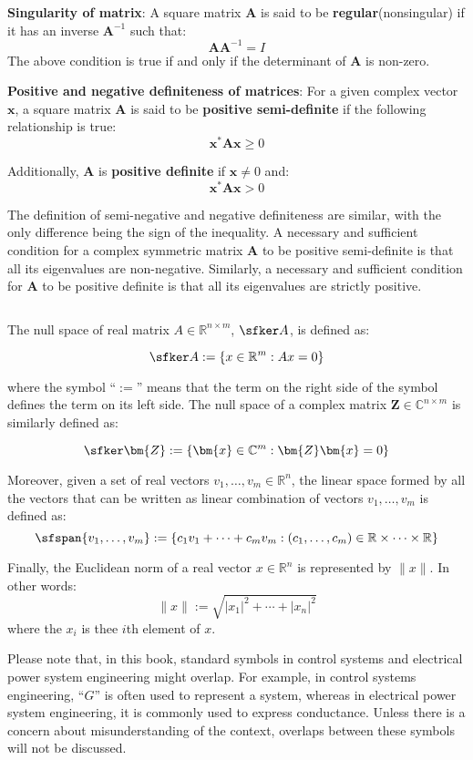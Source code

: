 \documentclass[graybox, envcountchap]{svmult}
\begin{document}
\begin{COLUMN}
\noindent \textbf{Singularity of matrix}:
A square matrix $\bm{A}$ is said to be \textbf{regular}(nonsingular) if it has
an inverse $\bm{A}^{-1}$ such that:
\[
\bm{A}\bm{A}^{-1}=I
\]
The above condition is true if and only if the determinant of $\bm{A}$ is
non-zero.
\smallskip

\noindent \textbf{Positive and negative definiteness of matrices}:
For a given complex vector $\bm{x}$, a square matrix $\bm{A}$ is said to be
\textbf{positive semi-definite} if the following relationship is true:
\[
\bm{x}^{*} \bm{A} \bm{x} \geq 0
\]

Additionally, $\bm{A}$ is \textbf{positive definite} if $\bm{x}\neq 0$ and: 
\[
\bm{x}^* \bm{A}\bm{x} > 0
\]

The definition of semi-negative and negative definiteness are similar, with the
only difference being the sign of the inequality. A necessary and sufficient
condition for a complex symmetric matrix $\bm{A}$ to be positive semi-definite
is that all its eigenvalues are non-negative. Similarly, a necessary and
sufficient condition for $\bm{A}$ to be positive definite is that all its
eigenvalues are strictly positive.

\end{COLUMN}

The null space of real matrix $A\in \mathbb{R}^{n\times m}$, $\sfker A$, is
defined as:

\[
\sfker A:= \left\{
x\in \mathbb{R}^{m} : Ax =0
\right\}
\]

where the symbol “$:=$” means that the term on the right side of the symbol
defines the term on its left side. The null space of a complex matrix $\bm{Z}
\in \mathbb{C}^{n\times m}$ is similarly defined as:

\[
\sfker \bm{Z}:= \left\{
\bm{x}\in \mathbb{C}^{m} : \bm{Z}\bm{x} =0
\right\}
\]

Moreover, given a set of real vectors $v_1,\ldots,v_m\in \mathbb{R}^{n}$, the
linear space formed by all the vectors that can be written as linear combination
of vectors $v_1,\ldots,v_m$ is defined as:
\[
\sfspan\{v_1,\ldots,v_m\}:=\left\{
c_1 v_1+\cdots+c_m v_m : 
(c_1,\ldots,c_m)\in \mathbb{R}\times \cdots \times \mathbb{R}
\right\}
\]

Finally, the Euclidean norm of a real vector $x\in \mathbb{R}^n$ is represented
by $\|x\|$. In other words:
\[
\|x\| := \sqrt{|x_1|^2+\cdots+|x_n|^2}
\]
where the $x_i$ is thee $i$th element of $x$.

Please note that, in this book, standard symbols in control systems and
electrical power system engineering might overlap. For example, in control
systems engineering, “$G$” is often used to represent a system, whereas in
electrical power system engineering, it is commonly used to express conductance.
Unless there is a concern about misunderstanding of the context, overlaps
between these symbols will not be discussed.

\newpage
\end{document}
